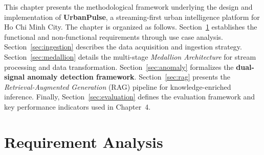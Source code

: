 
  This chapter presents the methodological framework underlying the design and                                                                            
  implementation of \textbf{UrbanPulse}, a streaming-first urban intelligence
  platform for Ho Chi Minh City. The chapter is organized as follows.                                                                                     
  Section~\ref{sec:requirements} establishes the functional and non-functional
  requirements through use case analysis. Section~\ref{sec:ingestion} describes                                                                           
  the data acquisition and ingestion strategy. Section~\ref{sec:medallion}
  details the multi-stage \textit{Medallion Architecture} for stream processing                                                                           
  and data transformation. Section~\ref{sec:anomaly} formalizes the                                                                                       
  \textbf{dual-signal anomaly detection framework}. Section~\ref{sec:rag}                                                                                 
  presents the \textit{Retrieval-Augmented Generation} (RAG) pipeline for                                                                                 
  knowledge-enriched inference. Finally, Section~\ref{sec:evaluation} defines                                                                             
  the evaluation framework and key performance indicators used in Chapter~4.                                                                              
                                                                                                                                                          
  \section{Requirement Analysis}                                                                                                                          
  \label{sec:requirements}
   
